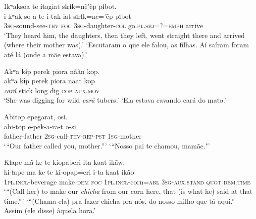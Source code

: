 \documentclass[output=paper,
modfonts,nonflat
]{langsci/langscibook}
\begin{document}
  
\ea Ikʷaksoa te itagiat sɨrɨk=nẽ'ẽp pɨbot.\\[.3em]
\gll i-kʷak-so-a te i-tak-iat sɨrɨk=ne='ẽp pɨbot\\
     \textsc{3sg}-sound-see-\textsc{thv} \textsc{foc} \textsc{3sg}-daughter-\textsc{col} go.\textsc{pl.sbj}=?=\textsc{emph} arrive\\
\glt ‘They heard him, the daughters, then they left, went straight there and arrived (where their mother was).’
\glt ‘Escutaram o que ele falou, as filhas. Aí saíram foram até lá (onde a mãe estava).'
\z 

\ea Akʷa kɨp perek piora nããn kop.\\[.3em]
\gll akʷa kɨp perek piora naat kop\\
     \textit{cará}{\footnotemark} stick long dig \textsc{cop} \textsc{aux.mov}\\
\glt ‘She was digging for wild \textit{cará} tubers.’{\footnotemark}
\glt ‘Ela estava cavando cará do mato.'
\addtocounter{footnote}{-1}
\z

\ea Abitop{\footnotemark} epegarat, osi.\\[.3em]
\gll abi-top e-pek-a-ra-t o-si\\
     father-father \textsc{2sg}-call-\textsc{thv-rep-pst} \textsc{1sg}-mother\\
\glt ‘“Our father called you, mother.”’
\glt ‘“Nosso pai te chamou, mamãe."'
\z 

\ea Kɨape mã ke te kiopaberi ita kaat ikãw.\\[.3em]
\gll ki-ɨape ma ke te ki-opap=eri i-ta kaat ikão\\
     \textsc{1pl.incl}-beverage make \textsc{dem} \textsc{foc} \textsc{1pl.incl}-corn=\textsc{abl} \textsc{3sg-aux.stand} \textsc{quot} \textsc{dem.time}\\
\glt ‘“(Call her) to make our \textit{chicha}{\footnotemark} from our corn here, that (is what he) said at that time.”’
\glt ‘“(Chama ela) pra fazer chicha pra nós, do nosso milho que tá 
aqui.” Assim (ele disse) àquela hora.'
\z  
\end{document}
